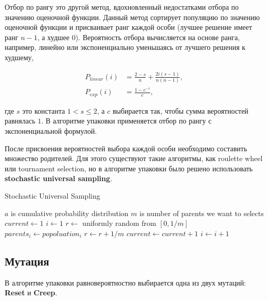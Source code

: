 \documentclass{fefu_thesis/cls/fefu}
\newenvironment{algo}[1][]
  {\begin{algorithm}[#1]
     \selectlanguage{english}
     \floatname{algorithm}{Алгоритм}
  }
  {\end{algorithm}}
\begin{document}
    Отбор по рангу\cite{RankingSelection} это другой метод, вдохновленный недостатками отбора по значению оценочной функции. Данный метод сортирует популяцию по значению оценочной функции и присваивает ранг каждой особи (лучшее решение имеет ранг $n - 1$, а худшее $0$). Вероятность отбора вычисляется на основе ранга, например, линейно или экспоненциально уменьшаясь от лучшего решения к худшему,

    \begin{align*}
        P_{linear}\left(i\right) &= \frac{2 - s}{n} + \frac{2i\left(s - 1\right)}{n\left(n - 1\right)},\\
        P_{exp}\left(i\right) &= \frac{1 - e^{-i}}{c},
    \end{align*}

    где $s$ это константа $1 < s\leq 2$, а $c$ выбирается так, чтобы сумма вероятностей равнялась $1$. В алгоритме упаковки применяется отбор по рангу с экспоненциальной формулой.

    После присвоения вероятностей выбора каждой особи необходимо составить множество родителей. Для этого существуют такие алгоритмы, как roulette wheel или tournament selection, но в алгоритме упаковки было решено использовать \textbf{stochastic universal sampling}\cite{RankingSelection}.

    \begin{algo}[H]
        \caption{Stochastic Universal Sampling}
        \begin{algorithmic}[1]
            \State $a$ is cumulative probability distribution
            \State $m$ is number of parents we want to selects
            \State $current \gets 1$
            \State $i \gets 1$
            \State $r \gets$ uniformly random from $\left[0, 1 / m\right]$
                    \State $parents_i \gets popoluation_i$
                    \State $r \gets r + 1 / m$
                    \State $current \gets current + 1$
                \EndWhile
                \State $i \gets i + 1$
            \EndWhile
        \end{algorithmic}
    \end{algo}

    \subsection{Мутация}
    В алгоритме упаковки равновероятностно выбирается одна из двух мутаций: \textbf{Reset} и \textbf{Creep}.
\end{document}
